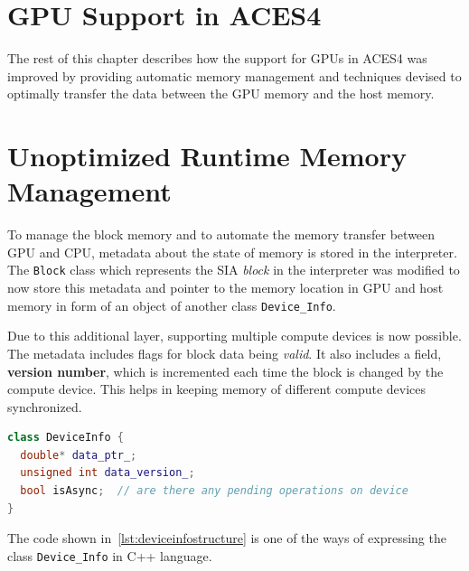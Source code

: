 \section{GPU Support in ACES4}
The rest of this chapter describes how the support for GPUs in ACES4 was improved
by providing automatic memory management and techniques devised to optimally transfer
the data between the GPU memory and the host memory.

\section{Unoptimized Runtime Memory Management}
To manage the block memory and to automate the memory transfer between GPU and CPU,
metadata about the state of memory is stored in the interpreter. The \texttt{Block} class
which represents the SIA \textit{block} in the interpreter was modified to now store
this metadata and pointer to the memory location in GPU and host memory in form of
an object of another class \texttt{Device\_Info}.

Due to this additional layer, supporting multiple compute devices is now possible.
The metadata includes flags for block data being \textit{valid}.
It also includes a field, \textbf{version number}, which is incremented each time the block is changed
by the compute device. This helps in keeping memory of different compute devices
synchronized.

\begin{lstlisting}[caption={\texttt{Device\_Info} class structure},
  language=C++,
  label={lst:deviceinfostructure}]
class DeviceInfo {
  double* data_ptr_;
  unsigned int data_version_;
  bool isAsync;  // are there any pending operations on device
}
\end{lstlisting}

The code shown in~\ref{lst:deviceinfostructure} is one of the ways of expressing
the class \texttt{Device\_Info} in C++ language.

